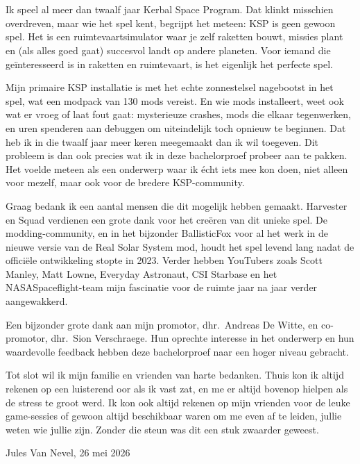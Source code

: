 
\chapter*{}%
\label{ch:voorwoord}

Ik speel al meer dan twaalf jaar Kerbal Space Program. Dat klinkt misschien overdreven, maar wie het spel kent, begrijpt het meteen: KSP is geen gewoon spel. Het is een ruimtevaartsimulator waar je zelf raketten bouwt, missies plant en (als alles goed gaat) succesvol landt op andere planeten. Voor iemand die geïnteresseerd is in raketten en ruimtevaart, is het eigenlijk het perfecte spel.

Mijn primaire KSP installatie is met het echte zonnestelsel nagebootst in het spel, wat een modpack van 130 mods vereist. En wie mods installeert, weet ook wat er vroeg of laat fout gaat: mysterieuze crashes, mods die elkaar tegenwerken, en uren spenderen aan debuggen om uiteindelijk toch opnieuw te beginnen. Dat heb ik in die twaalf jaar meer keren meegemaakt dan ik wil toegeven. Dit probleem is dan ook precies wat ik in deze bachelorproef probeer aan te pakken. Het voelde meteen als een onderwerp waar ik écht iets mee kon doen, niet alleen voor mezelf, maar ook voor de bredere KSP-community.

Graag bedank ik een aantal mensen die dit mogelijk hebben gemaakt. Harvester en Squad verdienen een grote dank voor het creëren van dit unieke spel. De modding-community, en in het bijzonder BallisticFox voor al het werk in de nieuwe versie van de Real Solar System mod, houdt het spel levend lang nadat de officiële ontwikkeling stopte in 2023. Verder hebben YouTubers zoals Scott Manley, Matt Lowne, Everyday Astronaut, CSI Starbase en het NASASpaceflight-team mijn fascinatie voor de ruimte jaar na jaar verder aangewakkerd.

Een bijzonder grote dank aan mijn promotor, dhr.\ Andreas De Witte, en co-promotor, dhr.\ Sion Verschraege. Hun oprechte interesse in het onderwerp en hun waardevolle feedback hebben deze bachelorproef naar een hoger niveau gebracht.

Tot slot wil ik mijn familie en vrienden van harte bedanken. Thuis kon ik altijd rekenen op een luisterend oor als ik vast zat, en me er altijd bovenop hielpen als de stress te groot werd. Ik kon ook altijd rekenen op mijn vrienden voor de leuke game-sessies of gewoon altijd beschikbaar waren om me even af te leiden, jullie weten wie jullie zijn. Zonder die steun was dit een stuk zwaarder geweest.

\bigskip

\noindent Jules Van Nevel, 26 mei 2026